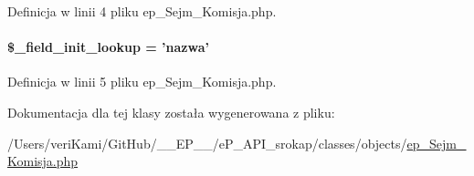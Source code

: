 Definicja w linii 4 pliku ep\-\_\-\-Sejm\-\_\-\-Komisja.\-php.

\hypertarget{classep___sejm___komisja_a4a4d54ae35428077a7c61ec8a5139af3}{
\paragraph[{\$\-\_\-field\-\_\-init\-\_\-lookup}]{\setlength{\rightskip}{0pt plus 5cm}\$\-\_\-field\-\_\-init\-\_\-lookup = 'nazwa'}}\label{classep___sejm___komisja_a4a4d54ae35428077a7c61ec8a5139af3}


Definicja w linii 5 pliku ep\-\_\-\-Sejm\-\_\-\-Komisja.\-php.



Dokumentacja dla tej klasy została wygenerowana z pliku\-:\begin{DoxyCompactItemize}
\item 
/\-Users/veri\-Kami/\-Git\-Hub/\-\_\-\-\_\-\-E\-P\-\_\-\-\_\-/e\-P\-\_\-\-A\-P\-I\-\_\-srokap/classes/objects/\hyperlink{ep___sejm___komisja_8php}{ep\-\_\-\-Sejm\-\_\-\-Komisja.\-php}\end{DoxyCompactItemize}
